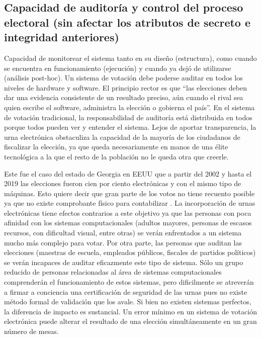 \subsection{Capacidad de auditoría y control del proceso electoral (sin afectar los atributos de secreto e integridad anteriores)}
Capacidad de monitorear el sistema tanto en su diseño (estructura), como cuando se encuentra en funcionamiento (ejecución) y cuando ya dejó de utilizarse (análisis post-hoc). Un sistema de votación debe poderse auditar en todos los niveles de hardware y software. El principio rector es que ``las elecciones deben dar una evidencia consistente de un resultado preciso, aún cuando el rival sea quien escribe el software, administra la elección o gobierna el país''.\newline
En el sistema de votación tradicional, la responsabilidad de auditoría está distribuida en todos porque todos pueden ver y entender el sistema. Lejos de aportar transparencia, la urna electrónica obstaculiza la capacidad de la mayoría de los ciudadanos de fiscalizar la elección, ya que queda necesariamente en manos de una élite tecnológica a la que el resto de la población no le queda otra que creerle.

Este fue el caso del estado de Georgia en EEUU que a partir del 2002 y hasta el 2019 las elecciones fueron cien por ciento electrónicas y con el mismo tipo de máquinas. Esto quiere decir que gran parte de los votos no tiene recuento posible ya que no existe comprobante físico para contabilizar \cite{eleccionesGeorgia}.\newline
La incorporación de urnas electrónicas tiene efectos contrarios a este objetivo ya que las personas con poca afinidad con los sistemas computacionales (adultos mayores, personas de escasos recursos, con dificultad visual, entre otras) se verán enfrentados a un sistema mucho más complejo para votar. Por otra parte, las personas que auditan las elecciones (maestras de escuela, empleados públicos, fiscales de partidos políticos) se verán incapaces de auditar eficazmente este tipo de sistema. Sólo un grupo reducido de personas relacionadas al área de sistemas computacionales comprenderán el funcionamiento de estos sistemas, pero dificilmente se atreverán a firmar a conciencia una certificación de seguridad de las urnas pues no existe método formal de validación que los avale. Si bien no existen sistemas perfectos, la diferencia de impacto es sustancial. Un error mínimo en un sistema de votación electrónica puede alterar el resultado de una elección simultáneamente en un gran número de mesas.

